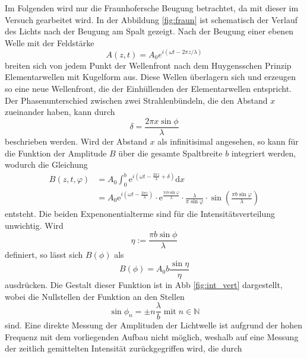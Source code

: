 Im Folgenden wird nur die Fraunhofersche Beugung betrachtet, da mit dieser im Versuch gearbeitet wird. 
In der Abbildung \ref{fig:fraun} ist schematisch der Verlauf des Lichts nach der Beugung am Spalt gezeigt. Nach der Beugung einer 
ebenen Welle mit der Feldstärke
\begin{equation}
    A(z,t) = A_0 e^{i(\omega t - 2\pi z / \lambda)} 
\end{equation}
breiten sich von jedem Punkt der Wellenfront nach dem Huygensschen Prinzip Elementarwellen mit Kugelform aus. Diese Wellen 
überlagern sich und erzeugen so eine neue Wellenfront, die der Einhüllenden der Elementarwellen entspricht. Der Phasenunterschied
zwischen zwei Strahlenbündeln, die den Abstand $x$ zueinander haben, kann durch 
\begin{equation}
    \delta = \frac{2\pi x \sin \phi}{\lambda}
\end{equation}
beschrieben werden. Wird der Abstand $x$  als infinitisimal angesehen, so kann für die Funktion der Amplitude $B$ über die gesamte
Spaltbreite $b$  integriert werden, wodurch die Gleichung 
\begin{align}
    B(z,t,\varphi) &= A_0 \int_0^b \mathrm{e}^{i(\omega t - \frac{2 \pi z}{\lambda} + \delta)} \mathrm{d}x \\
    &= A_0 \mathrm{e}^{i \left (\omega t - \frac{2 \pi z}{\lambda} \right )} \cdot \mathrm{e}^{\frac{\pi i b \sin \varphi}{\lambda}} \cdot \frac{\lambda}{\pi \sin \varphi} \cdot \sin \left (\frac{\pi b \sin \varphi}{\lambda} \right )
   \label{eqn:amp}
\end{align}
entsteht. 
Die beiden Expenonentialterme sind für die Intensitätsverteilung unwichtig. Wird 
\begin{equation}
    \eta := \frac{\pi b \sin\phi}{\lambda}
\end{equation}
definiert, so lässt sich $B(\phi)$ als 
\begin{equation}
    B(\phi) = A_0 b \frac{\sin\eta}{\eta}
    \label{eqn:amp_ez}
\end{equation}
ausdrücken. Die Gestalt dieser Funktion ist in Abb \ref{fig:int_vert} dargestellt, wobei die Nullstellen der Funktion an den Stellen
\begin{equation}
    \sin \phi_n = \pm n\frac{\lambda}{b}\;\text{mit}\; n\in \mathds{N}
\end{equation} 
sind. Eine direkte Messung der Amplituden der Lichtwelle ist aufgrund der hohen Frequenz mit dem vorliegenden Aufbau nicht möglich,
weshalb auf eine Messung der zeitlich gemittelten Intensität zurückgegriffen wird, die durch 
